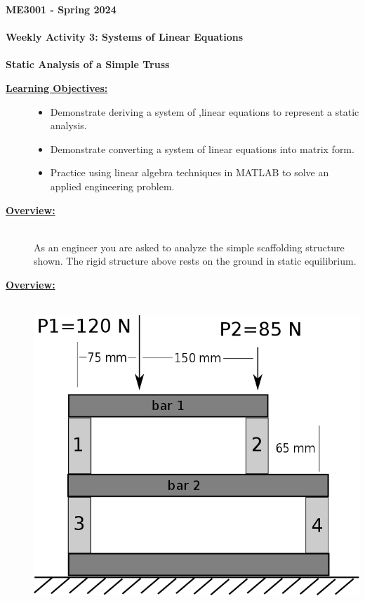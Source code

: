 \documentclass[11pt]{article}
\newcommand{\NUM}{3}
\begin{document}
	\textbf{\LARGE ME3001 - Spring 2024} \\\\
	\textbf{\LARGE Weekly Activity \NUM:  Systems of Linear Equations}\\\\
	\textbf{\LARGE Static Analysis of a Simple Truss} \\
	
	\begin{description}


\item[\textbf{\underline{Learning Objectives:}}] \hfill \vspace{0mm}

\begin{itemize}
  \item Demonstrate deriving a system of ,linear equations to represent a static analysis.
  \item Demonstrate converting a system of linear equations into matrix form.
  \item Practice using linear algebra techniques in MATLAB to solve an applied engineering problem.
\end{itemize}


\item[\textbf{\underline{Overview:}}] \hfill \vspace{3mm}\\

As an engineer you are asked to analyze the simple scaffolding structure shown. The rigid structure above rests on the ground in static equilibrium. 

\item[\textbf{\underline{Overview:}}] \hfill \vspace{3mm}\\
  
    
  \includegraphics[scale=.25]{quiz2_fig1.png}\\
    

\end{description}
\end{document}
